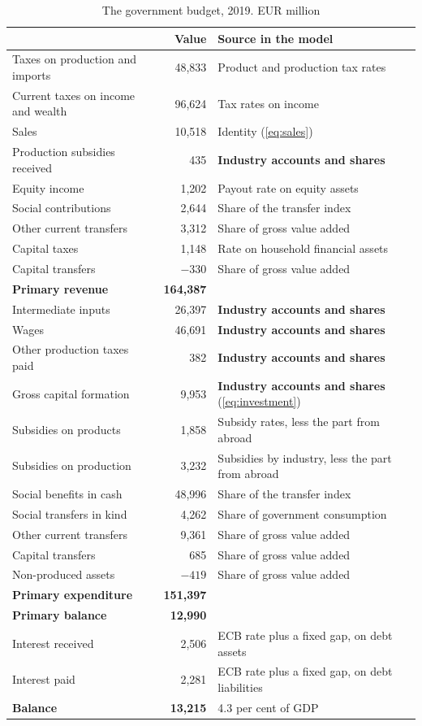\documentclass[11pt,a4paper]{article}
\begin{document}
\begin{table}[!tb]
\centering
\small
\caption{The government budget, 2019. EUR million}
\label{tab:budget}
\begin{tabular}{@{}lrl@{}}
\toprule
 & Value & Source in the model \\
\midrule
Taxes on production and imports & 48,833 & Product and production tax rates \\
Current taxes on income and wealth & 96,624 & Tax rates on income \\
Sales & 10,518 & Identity (\ref{eq:sales}) \\
Production subsidies received & 435 & \textbf{Industry accounts and shares} \\
Equity income & 1,202 & Payout rate on equity assets \\
Social contributions & 2,644 & Share of the transfer index \\
Other current transfers & 3,312 & Share of gross value added \\
Capital taxes & 1,148 & Rate on household financial assets \\
Capital transfers & $-330$ & Share of gross value added \\
\textbf{Primary revenue} & \textbf{164,387} & \\
\midrule
Intermediate inputs & 26,397 & \textbf{Industry accounts and shares} \\
Wages & 46,691 & \textbf{Industry accounts and shares} \\
Other production taxes paid & 382 & \textbf{Industry accounts and shares} \\
Gross capital formation & 9,953 & \textbf{Industry accounts and shares} (\ref{eq:investment}) \\
Subsidies on products & 1,858 & Subsidy rates, less the part from abroad \\
Subsidies on production & 3,232 & Subsidies by industry, less the part from abroad \\
Social benefits in cash & 48,996 & Share of the transfer index \\
Social transfers in kind & 4,262 & Share of government consumption \\
Other current transfers & 9,361 & Share of gross value added \\
Capital transfers & 685 & Share of gross value added \\
Non-produced assets & $-419$ & Share of gross value added \\
\textbf{Primary expenditure} & \textbf{151,397} & \\
\midrule
\textbf{Primary balance} & \textbf{12,990} & \\
Interest received & 2,506 & ECB rate plus a fixed gap, on debt assets \\
Interest paid & 2,281 & ECB rate plus a fixed gap, on debt liabilities \\
\textbf{Balance} & \textbf{13,215} & 4.3 per cent of GDP \\
\bottomrule
\end{tabular}
\end{table}
\end{document}
